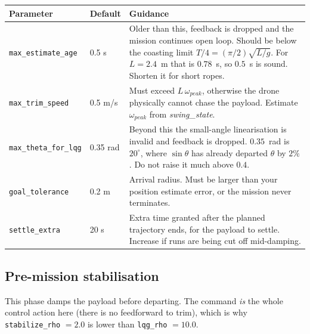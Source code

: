 \documentclass[11pt,a4paper]{article}
\newcommand{\param}[1]{\texttt{\small #1}}
\newcommand{\plot}[1]{\textit{#1}}
\begin{document}
\begin{center}
\begin{tabular}{@{}p{4.2cm}p{1.6cm}p{8.6cm}@{}}
\toprule
\textbf{Parameter} & \textbf{Default} & \textbf{Guidance} \\
\midrule
\param{max\_estimate\_age} & 0.5 s &
Older than this, feedback is dropped and the mission continues open loop.
Should be below the coasting limit $T/4=(\pi/2)\sqrt{L/g}$. For $L=2.4$~m that
is $0.78$~s, so $0.5$~s is sound. Shorten it for short ropes. \\
\param{max\_trim\_speed} & 0.5 m/s &
Must exceed $L\,\omega_{peak}$, otherwise the drone physically cannot chase the
payload. Estimate $\omega_{peak}$ from \plot{swing\_state}. \\
\param{max\_theta\_for\_lqg} & 0.35 rad &
Beyond this the small-angle linearisation is invalid and feedback is dropped.
$0.35$~rad is $20^\circ$, where $\sin\theta$ has already departed
$\theta$ by $2\%$. Do not raise it much above $0.4$. \\
\param{goal\_tolerance} & 0.2 m &
Arrival radius. Must be larger than your position estimate error, or the
mission never terminates. \\
\param{settle\_extra} & 20 s &
Extra time granted after the planned trajectory ends, for the payload to
settle. Increase if runs are being cut off mid-damping. \\
\bottomrule
\end{tabular}
\end{center}

\subsection{Pre-mission stabilisation}

This phase damps the payload before departing. The command \emph{is} the whole
control action here (there is no feedforward to trim), which is why
\param{stabilize\_rho} $=2.0$ is lower than \param{lqg\_rho} $=10.0$.
\end{document}
